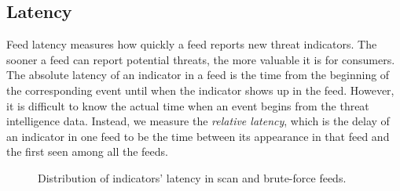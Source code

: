 \subsection{Latency}
\label{sec:ip-timing}

Feed latency measures how quickly a feed reports new threat indicators. The
sooner a feed can report potential threats, the more valuable it is for
consumers. The absolute latency of an indicator in a feed is the time from
the beginning of the corresponding event until when the indicator shows up in
the feed. However, it is difficult to know the actual time when an event begins
from the threat intelligence data. Instead, we measure the \textit{relative
latency}, which is the delay of an indicator in one feed to be the time between
its appearance in that feed and the first seen among all the feeds.

\begin{figure}[t!]
\centering
{}


\caption{Distribution of indicators' latency in scan and brute-force feeds.}
\label{fig:firstseen}
\end{figure}


